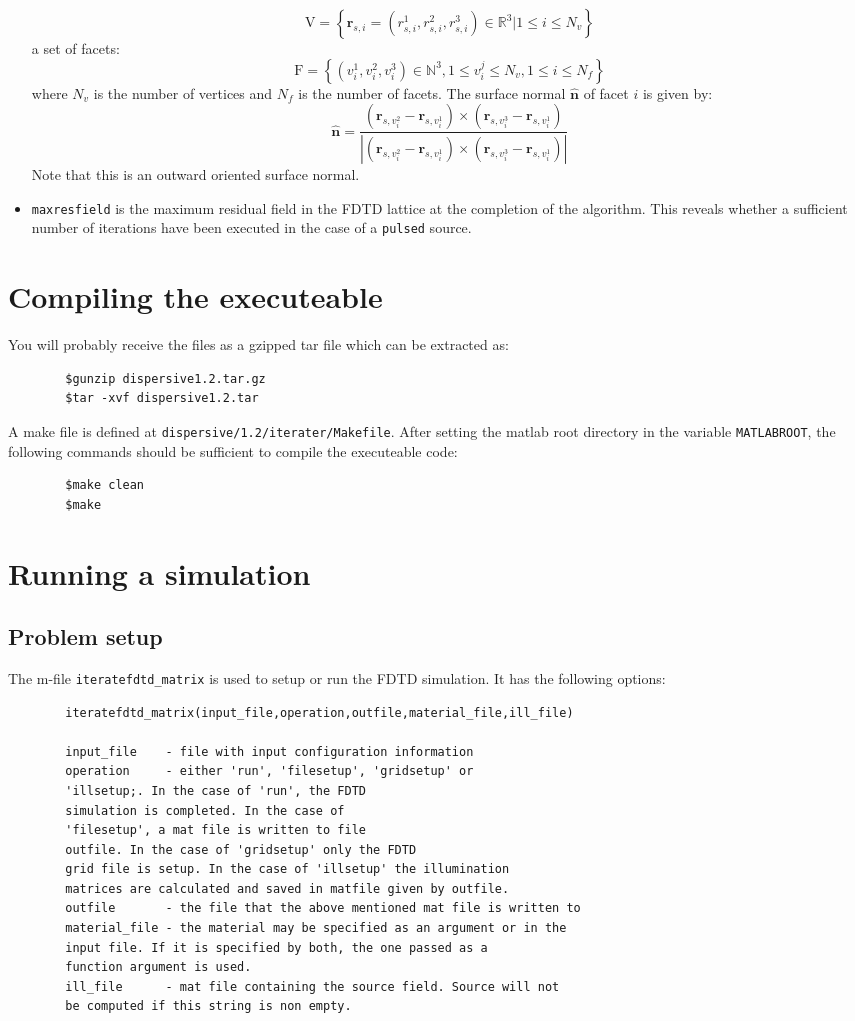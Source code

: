 \documentclass[a4paper, 12pt]{article}
\begin{document}
\begin{itemize}
		$$\mathrm{V}=\left\{\mathbf{r}_{s,i}=\left(r_{s,i}^1,r_{s,i}^2,r_{s,i}^3\right)\in
		\mathbb{R}^3|1\le i\le N_v \right\}$$a set of facets:
		$$\mathrm{F}=\left\{\left(v^1_i,v^2_i,v^3_i\right)\in\mathbb{N}^3,1\le
		v_i^j\le N_v,1\le i\le N_f \right\}$$ where $N_v$ is the number of
		vertices and $N_f$ is the number of facets. The surface normal
		$\hat{\boldsymbol{n}}$ of facet $i$ is given by:
		$$\hat{\boldsymbol{n}}=\frac{(\mathbf{r}_{s,v^2_i}-\mathbf{r}_{s,v^1_i})\times(\mathbf{r}_{s,v^3_i}-\mathbf{r}_{s,v^1_i})}{|(\mathbf{r}_{s,v^2_i}-\mathbf{r}_{s,v^1_i})\times(\mathbf{r}_{s,v^3_i}-\mathbf{r}_{s,v^1_i})|}$$Note
		that this is an outward oriented surface normal.
		\item \verb+maxresfield+ is the maximum residual field in the FDTD
		lattice at the completion of the algorithm. This reveals whether
		a sufficient number of iterations have been executed in the case of a
		\verb+pulsed+ source.
	\end{itemize}
	\section{Compiling the executeable}
	You will probably receive the files as a gzipped tar file which can be
	extracted as:
	\begin{verbatim}
		$gunzip dispersive1.2.tar.gz
		$tar -xvf dispersive1.2.tar
	\end{verbatim}
	A make file is defined at
	\verb+dispersive/1.2/iterater/Makefile+. After setting the matlab root
	directory in the variable \verb+MATLABROOT+, the following commands
	should be sufficient to compile the executeable code:
	\begin{verbatim}
		$make clean
		$make
	\end{verbatim}

	\section{Running a simulation}
	\subsection{Problem setup}
	The m-file \verb+iteratefdtd_matrix+ is used to setup or run the FDTD
	simulation. It has the following options:
	\begin{verbatim}
		iteratefdtd_matrix(input_file,operation,outfile,material_file,ill_file)

		input_file    - file with input configuration information
		operation     - either 'run', 'filesetup', 'gridsetup' or
		'illsetup;. In the case of 'run', the FDTD
		simulation is completed. In the case of
		'filesetup', a mat file is written to file
		outfile. In the case of 'gridsetup' only the FDTD
		grid file is setup. In the case of 'illsetup' the illumination
		matrices are calculated and saved in matfile given by outfile.
		outfile       - the file that the above mentioned mat file is written to
		material_file - the material may be specified as an argument or in the
		input file. If it is specified by both, the one passed as a
		function argument is used.
		ill_file      - mat file containing the source field. Source will not
		be computed if this string is non empty.
	\end{verbatim}
\end{document}
